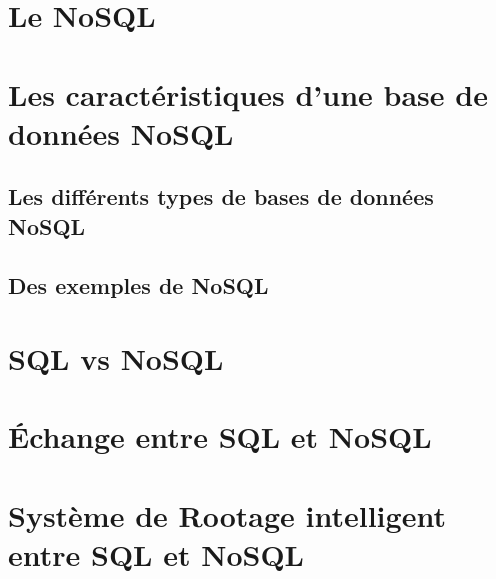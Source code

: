 \section{Le \textsf{NoSQL}}


\section{Les caractéristiques d'une base de données \textsf{NoSQL}}


\subsection{Les différents types de bases de données \textsf{NoSQL}}\label{categorie} 
 

\subsection{Des exemples de \textsf{NoSQL}}


\section{\textsf{SQL} vs \textsf{NoSQL}}


\section{Échange entre \textsf{SQL} et \textsf{NoSQL}}


\section{Système de Rootage intelligent entre \textsf{SQL} et \textsf{NoSQL}}

